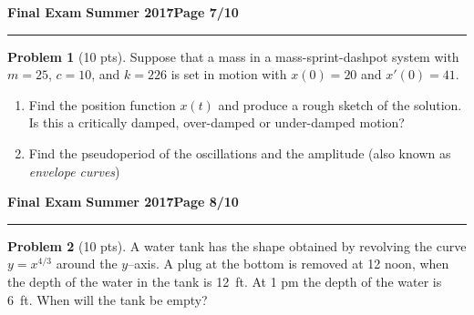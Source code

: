 \documentclass[12pt]{article}
\theoremstyle{definition}
\newtheorem{problem}{Problem}
\begin{document}
\hfill{\large\bf Final Exam}\hfill{\large\bf
Summer 2017}\hfill{\large\bf Page 7/10}\hrule

\bigskip
\begin{problem}[10 pts]
Suppose that a mass in a mass-sprint-dashpot system with $m=25$, $c=10$, and $k=226$ is set in motion with $x(0)=20$ and $x'(0)=41$. 
\begin{enumerate}
  \item Find the position function $x(t)$ and produce a rough sketch of the solution.  Is this a critically damped, over-damped or under-damped motion?
  \vspace{4cm}
  \begin{flushright}
  \end{flushright}
  \item Find the pseudoperiod of the oscillations and the amplitude (also known as \emph{envelope curves})
  \vspace{12cm}
  \begin{flushright}
  \end{flushright}
\end{enumerate}
\end{problem}
\newpage

\hfill{\large\bf Final Exam}\hfill{\large\bf
Summer 2017}\hfill{\large\bf Page 8/10}\hrule

\bigskip
\begin{problem}[10 pts]
A water tank has the shape obtained by revolving the curve $y=x^{4/3}$ around the $y$--axis.  A plug at the bottom is removed at 12 noon, when the depth of the water in the tank is 12~ft.  At 1 pm the depth of the water is 6~ft.  When will the tank be empty?
\vspace{19cm}
\begin{flushright}
\end{flushright}
\end{problem}
\newpage
\end{document}
